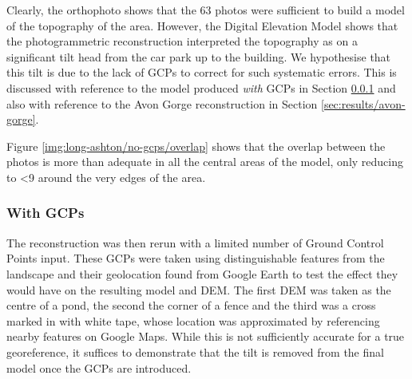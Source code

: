 Clearly, the orthophoto shows that the 63 photos were sufficient to build a
model of the topography of the area. However, the Digital Elevation Model shows
that the photogrammetric reconstruction interpreted the topography as on a
significant tilt head from the car park up to the building. We hypothesise that
this tilt is due to the lack of GCPs to correct for such systematic errors. This
is discussed with reference to the model produced \textit{with} GCPs in Section
\ref{sec:results/long-ashton/with-gcps} and also with reference to the Avon Gorge
reconstruction in Section \ref{sec:results/avon-gorge}.

Figure \ref{img:long-ashton/no-gcps/overlap} shows that the overlap between the
photos is more than adequate in all the central areas of the model, only
reducing to \textless 9 around the very edges of the area.

\subsubsection{With GCPs}
\label{sec:results/long-ashton/with-gcps}

The reconstruction was then rerun with a limited number of Ground Control Points
input. These GCPs were taken using distinguishable features from the landscape
and their geolocation found from Google Earth to test the effect they would have
on the resulting model and DEM. The first DEM was taken as the centre of a pond,
the second the corner of a fence and the third was a cross marked in with white
tape, whose location was approximated by referencing nearby features on Google
Maps. While this is not sufficiently accurate for a true georeference, it
suffices to demonstrate that the tilt is removed from the final model once the
GCPs are introduced.

